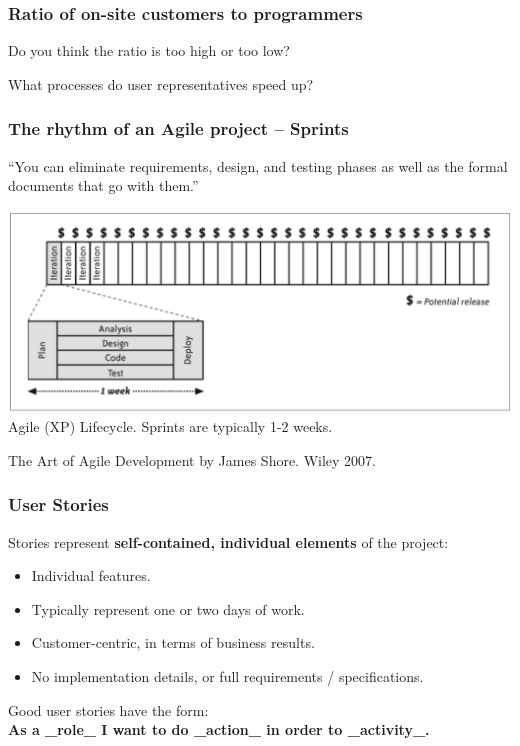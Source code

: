 \documentclass{beamer} %
\newcommand\emc[1]{\textcolor{brightblue}{\textbf{#1}}}
\begin{document}
\begin{frame}
\frametitle{Ratio of on-site customers to programmers}

Do you think the ratio is too high or too low?

\vspace{5mm}
What processes do user representatives speed up?

\end{frame}



\begin{frame}
\frametitle{The rhythm of an Agile project -- Sprints}

``You can eliminate requirements, design, and testing phases as well as the formal documents that go with them.''

\begin{center}
\includegraphics[scale=0.35]{assets/agile} \\
Agile (XP) Lifecycle. Sprints are typically 1-2 weeks.
\end{center}

{\small The Art of Agile Development by James Shore. Wiley 2007.}

\end{frame}


\begin{frame}

\frametitle{User Stories}

Stories represent \emc{self-contained, individual elements} of the project: 
\begin{itemize}
\item Individual features.
\item Typically represent one or two days of work.
\item Customer-centric, in terms of business results.
\item No implementation details, or full requirements / specifications.
\end{itemize}

\vspace{5mm}
Good user stories have the form: \\ \emc{As a \_role\_ I want to do \_action\_ in order to \_activity\_.}

\end{frame}
\end{document}
